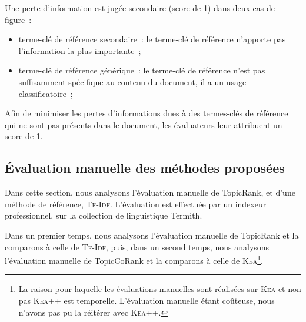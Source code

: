         Une perte d'information est jugée secondaire (score de 1) dans deux
        cas de figure~:
        \begin{itemize}
          \item{terme-clé de référence secondaire~: le terme-clé de référence
                n'apporte pas l'information la plus importante~;
                }
          \item{terme-clé de référence générique~: le terme-clé de référence
                n'est pas suffisamment spécifique au contenu du document, il a
                un usage classificatoire~; }
        \end{itemize}
        Afin de minimiser les pertes d'informations dues à des termes-clés de
        référence qui ne sont pas présents dans le document, les évaluateurs
        leur attribuent un score de 1.

    \subsection{Évaluation manuelle des méthodes proposées}
    \label{subsec:main-domain_specific_keyphrase_annotation-manual_evaluation-analysis}
      Dans cette section, nous analysons l'évaluation manuelle de TopicRank,
      et d'une méthode de référence, \textsc{Tf-Idf}. L'évaluation est
      effectuée par un indexeur professionnel, sur la collection de linguistique
      Termith.

      Dans un premier temps, nous analysons l'évaluation manuelle de TopicRank
      et la comparons à celle de \textsc{Tf-Idf}, puis, dans un second temps,
      nous analysons l'évaluation manuelle de TopicCoRank et la comparons à
      celle de \textsc{Kea}\footnote{La raison pour laquelle les évaluations
      manuelles sont réalisées sur \textsc{Kea} et non pas \textsc{Kea++} est
      temporelle. L'évaluation manuelle étant coûteuse, nous n'avons pas pu
      la réitérer avec \textsc{Kea++}.}.

